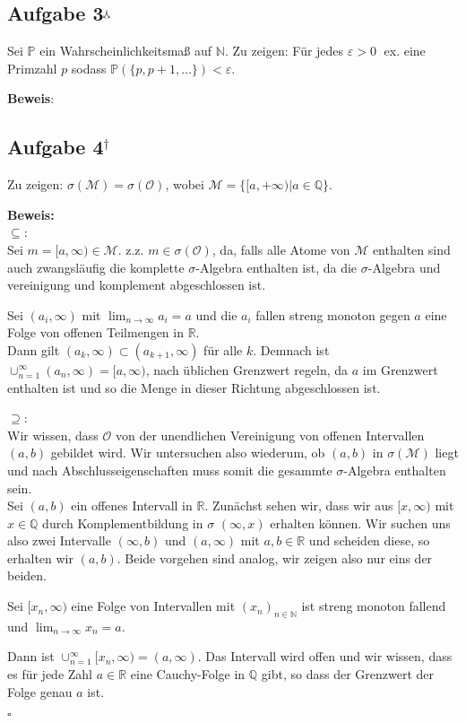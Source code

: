 \documentclass[11pt,a4paper,ngerman]{article}
\newcommand{\set}[1]{ \{ #1 \}}
\newcommand{\Prob}{\mathbb{P}}
\begin{document}
\subsection*{Aufgabe 3$^\curlywedgedownarrow$}
Sei $\Prob$ ein Wahrscheinlichkeitsmaß auf $\mathbb{N}$. Zu zeigen: Für jedes $\varepsilon > 0 \; $ ex. eine Primzahl $p$ sodass $\Prob(\set{p,p+1,\ldots}) < \varepsilon$.

\textbf{Beweis}: \\



\subsection*{Aufgabe 4$^\dagger$}
Zu zeigen: $\sigma(\mathcal{M}) = \sigma(\mathcal{O})$, wobei $\mathcal{M} = \set{[a, +\infty) | a \in \mathbb{Q}}$.

\textbf{Beweis:}\\

$\subseteq$:\\

Sei $m = [ a, \infty) \in \mathcal{M}$. z.z. $m \in \sigma (\mathcal{O})$,
da, falls alle Atome von $\mathcal{M}$ enthalten sind auch zwangsläufig die
komplette $\sigma$-Algebra enthalten ist, da die $\sigma$-Algebra und vereinigung und komplement abgeschlossen ist.


Sei $(a_i, \infty)$ mit $\lim_{n\rightarrow \infty} a_i = a$ und die $a_i$ fallen streng monoton gegen $a$ eine
Folge von offenen Teilmengen in $\mathbb{R}$.\\
Dann gilt $(a_k, \infty) \subset (a_{k+1}, \infty)$ für alle $k$.
Demnach ist $\cup_{n=1}^\infty (a_n, \infty) = [a, \infty)$, nach üblichen
Grenzwert regeln, da $a$ im Grenzwert enthalten ist und so die Menge in dieser
Richtung abgeschlossen ist.

$\supseteq$:\\

Wir wissen, dass $\mathcal{O}$ von der unendlichen Vereinigung von 
offenen Intervallen $(a,b)$ gebildet wird. Wir untersuchen also wiederum, ob
$(a,b)$ in $\sigma(\mathcal{M})$ liegt und nach Abschlusseigenschaften muss
somit die gesammte $\sigma$-Algebra enthalten sein.\\

Sei $(a,b)$ ein offenes Intervall in $\mathbb{R}$. Zunächst sehen wir,
dass wir aus $[x, \infty)$ mit $x \in \mathbb{Q}$ durch Komplementbildung in $\sigma$ $(\infty, x)$ erhalten können.
Wir suchen uns also zwei Intervalle $(\infty, b)$ und $(a, \infty)$ mit $a,b \in \mathbb{R}$ und scheiden diese, so erhalten wir $(a,b)$. Beide vorgehen sind
analog, wir zeigen also nur eins der beiden.


Sei $[x_n, \infty)$ eine Folge von Intervallen mit $(x_n)_{n \in \mathbb{N}}$
ist streng monoton fallend und $\lim_{n\rightarrow\infty} x_n = a$.

Dann ist $\cup_{n=1}^\infty [x_n, \infty) = (a, \infty)$. Das Intervall wird
offen und wir wissen, dass es für jede Zahl $a \in \mathbb{R}$ eine Cauchy-Folge in $\mathbb{Q}$ gibt, so dass der Grenzwert der Folge genau $a$ ist.

\mbox{}\hfill$\square$

\label{LastPage}
\end{document}
